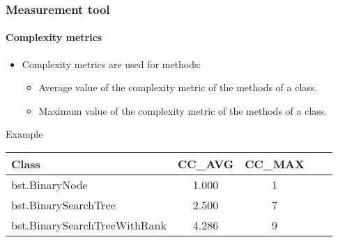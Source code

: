 \begin{frame}
\frametitle{Measurement tool}
\framesubtitle{Complexity metrics}
\label{concept:cyclomatic-complexity}

\begin{block:fact}{}
\begin{itemize}
	\item Complexity metrics are used for methods:
	\begin{itemize}
		\item Average value of the complexity metric of the methods of a
		class.

		\item Maximum value of the complexity metric of the methods of a
		class.
	\end{itemize}
\end{itemize}
\end{block:fact}

\begin{block}{Example}
\small
\begin{tabular}{|l|c|c|c|c|}
\hline
\textbf{Class}				& \textbf{CC\_AVG}	& \textbf{CC\_MAX}\\\hline
bst.BinaryNode 				& 1.000				& 1\\\hline
bst.BinarySearchTree 		& 2.500				& 7\\\hline
bst.BinarySearchTreeWithRank& 4.286				& 9\\\hline
\end{tabular}
\end{block}
\end{frame}

